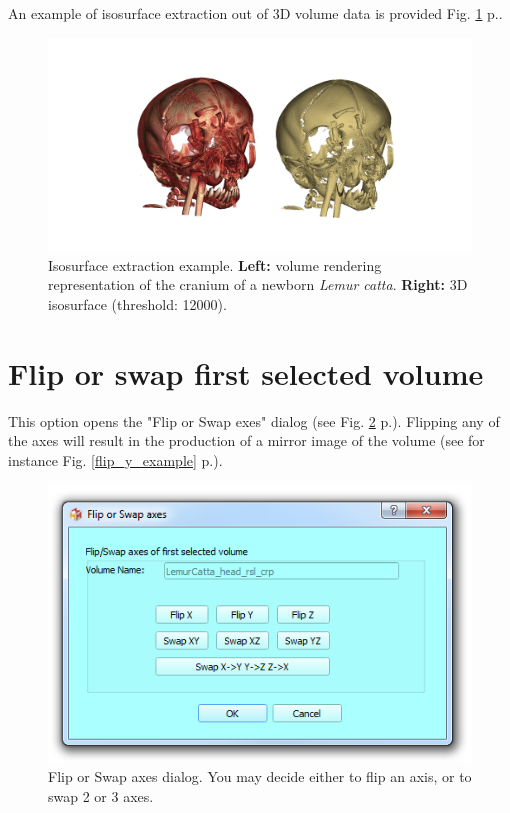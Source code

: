 An example of isosurface extraction out of 3D volume data is provided Fig. \ref{isosurface_example} p.\pageref{isosurface_example}.
\begin{figure}
  \centering
  \includegraphics[scale=0.5]{images/14/isosurface/isosurface_lemur_catta_t12000.png}
\caption{Isosurface extraction example. \textbf{Left:} volume rendering representation of the cranium of a newborn \textsl{Lemur catta}. \textbf{Right:} 3D isosurface (threshold: 12000).}	
\label{isosurface_example}
 \end{figure}




\section{Flip or swap first selected volume}
This option opens the "Flip or Swap exes" dialog (see Fig. \ref{flip_swap_dialog} p.\pageref{flip_swap_dialog}). Flipping any of the axes will result in the production of a mirror image of the volume (see for instance Fig. \ref{flip_y_example} p.\pageref{flip_y_example}).
 
\begin{figure}
  \centering
  \includegraphics[scale=0.5]{images/14/flip_swap/flip_swap_dialog.png}
\caption{Flip or Swap axes dialog. You may decide either to flip an axis, or to swap 2 or 3 axes.}	
\label{flip_swap_dialog}
 \end{figure}


